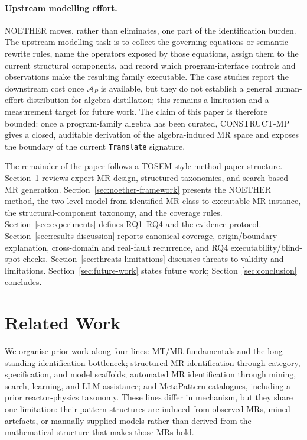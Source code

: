 \documentclass[manuscript]{acmart}
\begin{document}
\paragraph{Upstream modelling effort.} NOETHER moves, rather than eliminates, one part of the identification burden. The upstream modelling task is to collect the governing equations or semantic rewrite rules, name the operators exposed by those equations, assign them to the current structural components, and record which program-interface controls and observations make the resulting family executable. The case studies report the downstream cost once $\mathcal{A}_P$ is available, but they do not establish a general human-effort distribution for algebra distillation; this remains a limitation and a measurement target for future work. The claim of this paper is therefore bounded: once a program-family algebra has been curated, CONSTRUCT-MP gives a closed, auditable derivation of the algebra-induced MR space and exposes the boundary of the current \texttt{Translate} signature.

The remainder of the paper follows a TOSEM-style method-paper structure. Section~\ref{sec:related} reviews expert MR design, structured taxonomies, and search-based MR generation. Section~\ref{sec:noether-framework} presents the NOETHER method, the two-level model from identified MR class to executable MR instance, the structural-component taxonomy, and the coverage rules. Section~\ref{sec:experiments} defines RQ1--RQ4 and the evidence protocol. Section~\ref{sec:results-discussion} reports canonical coverage, origin/boundary explanation, cross-domain and real-fault recurrence, and RQ4 executability/blind-spot checks. Section~\ref{sec:threats-limitations} discusses threats to validity and limitations. Section~\ref{sec:future-work} states future work; Section~\ref{sec:conclusion} concludes.

\section{Related Work}
\label{sec:related}

We organise prior work along four lines: MT/MR fundamentals and the long-standing identification bottleneck; structured MR identification through category, specification, and model scaffolds; automated MR identification through mining, search, learning, and LLM assistance; and MetaPattern catalogues, including a prior reactor-physics taxonomy. These lines differ in mechanism, but they share one limitation: their pattern structures are induced from observed MRs, mined artefacts, or manually supplied models rather than derived from the mathematical structure that makes those MRs hold.
\end{document}
